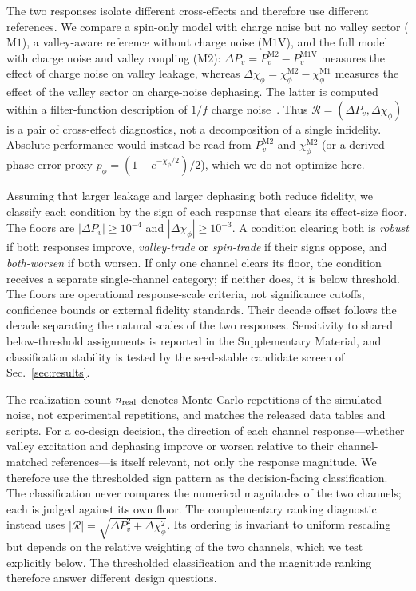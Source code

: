 \documentclass[aip,jap,reprint,superscriptaddress,longbibliography,floatfix]{revtex4-2}
\begin{document}
The two responses isolate different cross-effects and therefore use different
references. We compare a spin-only model with charge noise but no valley sector
($\mathrm{M1}$), a valley-aware reference without charge noise
($\mathrm{M1V}$), and the full model with charge noise and valley coupling
($\mathrm{M2}$):
$\Delta P_v=P_v^{\mathrm{M2}}-P_v^{\mathrm{M1V}}$ measures the effect of charge
noise on valley leakage, whereas
$\Delta\chi_\phi=\chi_\phi^{\mathrm{M2}}-\chi_\phi^{\mathrm{M1}}$ measures the effect of
the valley sector on charge-noise dephasing. The latter is computed within a
filter-function description of $1/f$ charge
noise~\cite{burkard_semiconductor_2023,struck_low-frequency_2020,viola_dynamical_1999}.
Thus $\mathcal{R}=(\Delta P_v,\Delta\chi_\phi)$ is a pair of cross-effect
diagnostics, not a decomposition of a single infidelity. Absolute performance
would instead be read from $P_v^{\mathrm{M2}}$ and
$\chi_\phi^{\mathrm{M2}}$ (or a derived phase-error proxy
$p_\phi=(1-e^{-\chi_\phi/2})/2$), which we do not optimize here.

Assuming that larger leakage and larger dephasing both reduce fidelity, we
classify each condition by the sign of each response that clears its
effect-size floor. The floors are $|\Delta P_v|\ge10^{-4}$ and
$|\Delta\chi_\phi|\ge10^{-3}$. A condition clearing both is \emph{robust} if
both responses improve, \emph{valley-trade} or \emph{spin-trade} if their signs
oppose, and \emph{both-worsen} if both worsen. If only one channel clears its
floor, the condition receives a separate single-channel category; if neither
does, it is below threshold. The floors are operational response-scale
criteria, not significance cutoffs, confidence bounds or external fidelity
standards. Their decade offset follows the decade separating the natural scales
of the two responses. Sensitivity to shared below-threshold assignments is
reported in the Supplementary Material, and classification stability is tested
by the seed-stable candidate screen of Sec.~\ref{sec:results}.

The realization count $n_{\rm real}$ denotes Monte-Carlo repetitions of the
simulated noise, not experimental repetitions, and matches the released data
tables and scripts. For a co-design decision, the direction of each channel
response---whether valley excitation and dephasing improve or worsen relative
to their channel-matched references---is itself relevant, not only the response
magnitude. We therefore use the thresholded sign pattern as the decision-facing
classification. The classification never compares the numerical magnitudes of
the two channels; each is judged against its own floor. The complementary
ranking diagnostic instead uses
$|\mathcal{R}|=\sqrt{\Delta P_v^2+\Delta\chi_\phi^2}$. Its ordering is
invariant to uniform rescaling but depends on the relative weighting of the two
channels, which we test explicitly below. The thresholded classification and
the magnitude ranking therefore answer different design questions.
\end{document}
